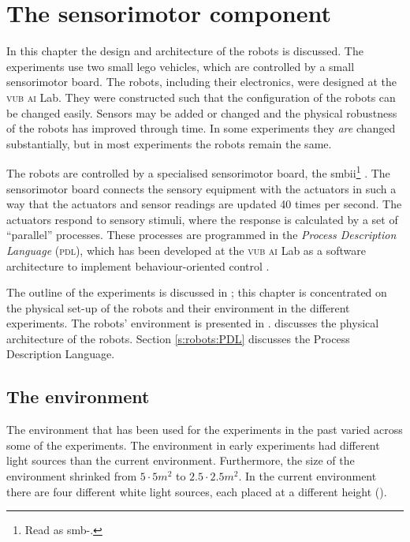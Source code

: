 \chapter{The sensorimotor component}\label{ch:robots}

In this chapter the design and architecture of the robots is discussed. The experiments use two small {\sc lego} vehicles, which are controlled by a small sensorimotor board. The robots, including their electronics, were designed at the {\scshape vub ai} Lab. They were constructed such that the configuration of the robots can be changed easily. Sensors may be added or changed and the physical robustness of the robots has improved through time. In some experiments they {\it are} changed substantially, but in most experiments the robots remain the same.

The robots are controlled by a specialised sensorimotor board, the {\sc smbii}\footnote{Read as {\sc smb}-.} \citep{vereertbrugghen:1996}. The sensorimotor board connects the sensory equipment with the actuators in such a way that the actuators and sensor readings are updated 40 times per second. The actuators respond to sensory stimuli, where the response is calculated by a set of ``parallel'' processes. These processes are programmed in the {\em Process Description Language} (\textsc{pdl}), which has been developed at the {\scshape vub ai} Lab as a software architecture to implement behaviour-oriented control \citep{steels:1994b}. 

The outline of the experiments is discussed in ; this chapter is concentrated on the physical set-up of the robots and their environment in the different experiments. The robots' environment is presented in .  discusses the physical architecture of the robots. Section \ref{s:robots:PDL} discusses the Process Description Language. 

\section{The environment}\label{s:robots:envir}

The environment that has been used for the experiments in the past varied across some of the experiments. The environment in early experiments \citep{steelsvogt:1997,vogt:1998b,vogt:1998a} had different light sources than the current environment. Furthermore, the size of the environment shrinked from $5\cdot 5 m^2$ to $2.5\cdot 2.5 m^2$. In the current environment there are four different white light sources, each placed at a different height ().

